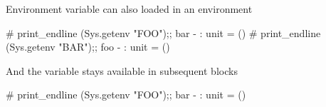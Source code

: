 Environment variable can also loaded in an environment

\begin{ocaml}
  # print_endline (Sys.getenv "FOO");;
  bar
  - : unit = ()
  # print_endline (Sys.getenv "BAR");;
  foo
  - : unit = ()
\end{ocaml}

And the variable stays available in subsequent blocks

\begin{ocaml}
  # print_endline (Sys.getenv "FOO");;
  bar
  - : unit = ()
\end{ocaml}
